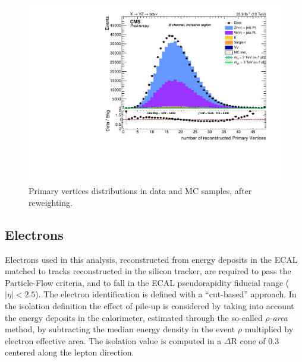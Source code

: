  \begin{figure}[!htb]
  \centering
    \includegraphics[width=.495\textwidth]{plots/v9_U/XVZnnInc/nPV.pdf}
  \caption{Primary vertices distributions in data and MC samples, after reweighting.}
  \label{fig:npv}
 \end{figure}


\subsection{Electrons}\label{ssec:electrons}

Electrons used in this analysis, reconstructed from energy deposits in the ECAL matched to tracks reconstructed in the silicon tracker, are required to pass the Particle-Flow criteria, and to fall in the ECAL pseudorapidity fiducial range ($|\eta|<2.5$). The electron identification is defined with a ``cut-based'' approach. In the isolation definition the effect of pile-up is considered by taking into account the energy deposits in the calorimeter, estimated through the so-called \emph{$\rho$-area} method, by subtracting the median energy density in the event $\rho$ multiplied by electron effective area. The isolation value is computed in a $\Delta$R cone of 0.3 centered along the lepton direction.

